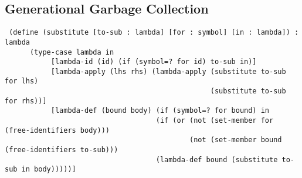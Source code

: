\documentclass{article}
\begin{document}
\subsection*{Generational Garbage Collection}

\pagebreak
\begin{verbatim}
 (define (substitute [to-sub : lambda] [for : symbol] [in : lambda]) : lambda
      (type-case lambda in
           [lambda-id (id) (if (symbol=? for id) to-sub in)]
           [lambda-apply (lhs rhs) (lambda-apply (substitute to-sub for lhs)
                                                 (substitute to-sub for rhs))]
           [lambda-def (bound body) (if (symbol=? for bound) in
                                    (if (or (not (set-member for (free-identifiers body)))
                                            (not (set-member bound (free-identifiers to-sub)))
                                    (lambda-def bound (substitute to-sub in body)))))]
\end{verbatim}
\end{document}
